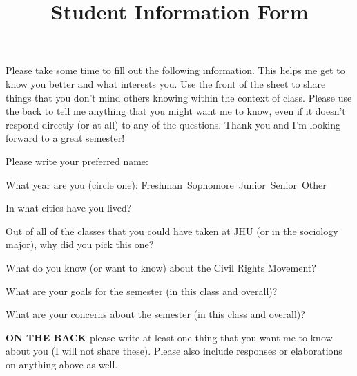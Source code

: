 \documentclass[11pt]{homework}
\title{Student Information Form}
\begin{document}
\maketitle 

\noindent Please take some time to fill out the following information. This helps me get to know you better and what interests you. Use the front of the sheet to share things that you don't mind others knowing within the context of class. Please use the back to tell me anything that you might want me to know, even if it doesn't respond directly (or at all) to any of the questions. Thank you and I'm looking forward to a great semester!


\begin{questions}
\question Please write your preferred name:

\question What year are you (circle one): Freshman\, Sophomore\, Junior\, Senior\, Other


\question In what cities have you lived? 
\begin{solution}[.5in]\end{solution}

\question Out of all of the classes that you could have taken at JHU (or in the sociology major), why did you pick this one? 
\begin{solution}[.5in]\end{solution}

\question What do you know (or want to know) about the Civil Rights Movement?
\begin{solution}[.5in]\end{solution}

\question What are your goals for the semester (in this class and overall)? 
\begin{solution}[.5in]\end{solution}

\question What are your concerns about the semester (in this class and overall)?
\begin{solution}[.5in]\end{solution}

\question \textbf{ON THE BACK} please write at least one thing that you want me to know about you (I will not share these). Please also include responses or elaborations on anything above as well. 

\end{questions}
\end{document}
